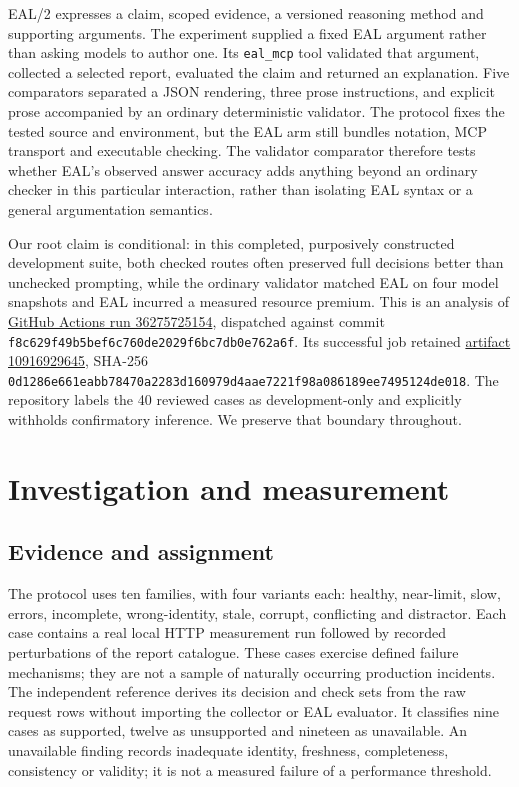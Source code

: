 \documentclass[11pt,a4paper]{article}
\newcommand{\code}[1]{\texttt{#1}}
\begin{document}
EAL/2 expresses a claim, scoped evidence, a versioned reasoning method and supporting arguments. The experiment supplied a fixed EAL argument rather than asking models to author one. Its \code{eal\_mcp} tool validated that argument, collected a selected report, evaluated the claim and returned an explanation. Five comparators separated a JSON rendering, three prose instructions, and explicit prose accompanied by an ordinary deterministic validator. The protocol fixes the tested source and environment, but the EAL arm still bundles notation, MCP transport and executable checking. The validator comparator therefore tests whether EAL's observed answer accuracy adds anything beyond an ordinary checker in this particular interaction, rather than isolating EAL syntax or a general argumentation semantics.

Our root claim is conditional: in this completed, purposively constructed development suite, both checked routes often preserved full decisions better than unchecked prompting, while the ordinary validator matched EAL on four model snapshots and EAL incurred a measured resource premium. This is an analysis of \href{https://github.com/emmett08/earl/actions/runs/36275725154}{GitHub Actions run 36275725154}, dispatched against commit \code{f8c629f49b5bef6c760de2029f6bc7db0e762a6f}. Its successful job retained \href{https://github.com/emmett08/earl/actions/runs/36275725154/artifacts/10916929645}{artifact 10916929645}, SHA-256 \code{0d1286e661eabb78470a2283d160979d4aae7221f98a086189ee7495124de018}. The repository labels the 40 reviewed cases as development-only and explicitly withholds confirmatory inference. We preserve that boundary throughout.

\section{Investigation and measurement}
\subsection{Evidence and assignment}
The protocol uses ten families, with four variants each: healthy, near-limit, slow, errors, incomplete, wrong-identity, stale, corrupt, conflicting and distractor. Each case contains a real local HTTP measurement run followed by recorded perturbations of the report catalogue. These cases exercise defined failure mechanisms; they are not a sample of naturally occurring production incidents. The independent reference derives its decision and check sets from the raw request rows without importing the collector or EAL evaluator. It classifies nine cases as supported, twelve as unsupported and nineteen as unavailable. An unavailable finding records inadequate identity, freshness, completeness, consistency or validity; it is not a measured failure of a performance threshold.
\end{document}
